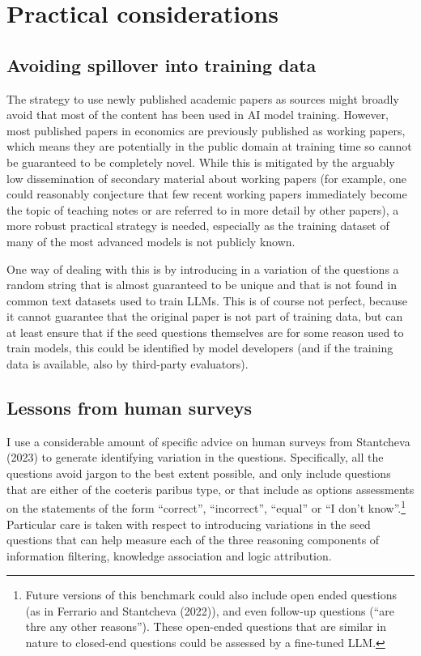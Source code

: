 \documentclass[
]{article}
\begin{document}
\section{Practical considerations}\label{practical-considerations}

\subsection{Avoiding spillover into training
data}\label{avoiding-spillover-into-training-data}

The strategy to use newly published academic papers as sources might
broadly avoid that most of the content has been used in AI model
training. However, most published papers in economics are previously
published as working papers, which means they are potentially in the
public domain at training time so cannot be guaranteed to be completely
novel. While this is mitigated by the arguably low dissemination of
secondary material about working papers (for example, one could
reasonably conjecture that few recent working papers immediately become
the topic of teaching notes or are referred to in more detail by other
papers), a more robust practical strategy is needed, especially as the
training dataset of many of the most advanced models is not publicly
known.

One way of dealing with this is by introducing in a variation of the
questions a random string that is almost guaranteed to be unique and
that is not found in common text datasets used to train LLMs. This is of
course not perfect, because it cannot guarantee that the original paper
is not part of training data, but can at least ensure that if the seed
questions themselves are for some reason used to train models, this
could be identified by model developers (and if the training data is
available, also by third-party evaluators).

\subsection{Lessons from human
surveys}\label{lessons-from-human-surveys}

I use a considerable amount of specific advice on human surveys from
Stantcheva (2023) to generate identifying variation in the questions.
Specifically, all the questions avoid jargon to the best extent
possible, and only include questions that are either of the coeteris
paribus type, or that include as options assessments on the statements
of the form ``correct'', ``incorrect'', ``equal'' or ``I don't
know''.\footnote{Future versions of this benchmark could also include
  open ended questions (as in Ferrario and Stantcheva (2022)), and even
  follow-up questions (``are thre any other reasons''). These open-ended
  questions that are similar in nature to closed-end questions could be
  assessed by a fine-tuned LLM.} Particular care is taken with respect
to introducing variations in the seed questions that can help measure
each of the three reasoning components of information filtering,
knowledge association and logic attribution.
\end{document}
